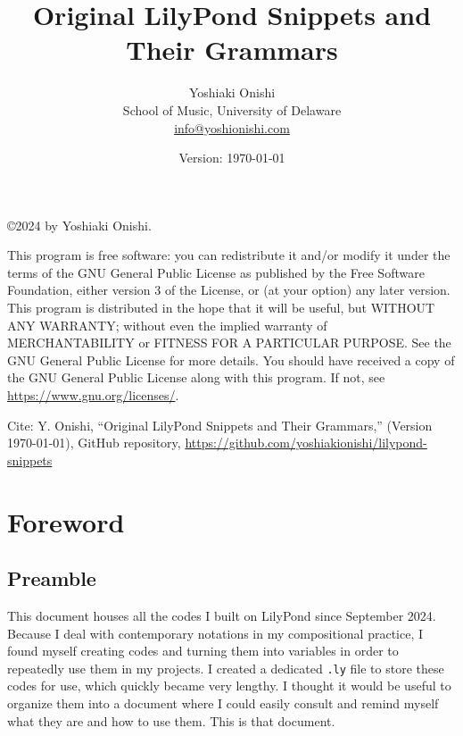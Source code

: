 \documentclass[11pt, oneside]{book}   	%
\title{Original LilyPond Snippets and Their Grammars}
\author{Yoshiaki Onishi\\School of Music, University of Delaware \\ \href{mailto:info@yoshionishi.com}{info@yoshionishi.com}}
\date{Version: \today}
\begin{document}
\maketitle




\copyright 2024 by Yoshiaki Onishi. 
\hfill \break
\break

This program is free software: you can redistribute it and/or modify it under the terms of the GNU General Public License as published by the Free Software Foundation, either version 3 of the License, or (at your option) any later version.
\hfill \break
\break
This program is distributed in the hope that it will be useful, but WITHOUT ANY WARRANTY; without even the implied warranty of MERCHANTABILITY or FITNESS FOR A PARTICULAR PURPOSE. See the GNU General Public License for more details.
\hfill \break
\break
You should have received a copy of the GNU General Public License along with this program. If not, see  \href{https://www.gnu.org/licenses/}{https://www.gnu.org/licenses/}.

\hfill \break
\break
Cite: Y. Onishi, “Original LilyPond Snippets and Their Grammars,” (Version \today), GitHub repository, \href{https://github.com/yoshiakionishi/lilypond-snippets}{https://github.com/yoshiakionishi/lilypond-snippets}\\ %


\frontmatter
\tableofcontents
\clearpage
\vfill \break


\chapter{Foreword}
\section{Preamble}
This document houses all the codes I built on LilyPond since September 2024. Because I deal with contemporary notations in my compositional practice, I found myself creating codes and turning them into variables in order to repeatedly use them in my projects. I created a dedicated \verb|.ly| file to store these codes for use, which quickly became very lengthy. I thought it would be useful to organize them into a document where I could easily consult and remind myself what they are and how to use them. This is that document.
\end{document}
